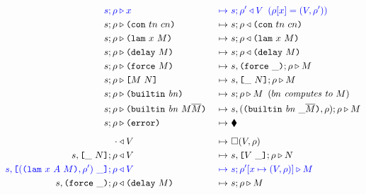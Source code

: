 \documentclass[../plutus-core-specification.tex]{subfiles}
\begin{document}
\begin{figure}[H]
\ContinuedFloat
  \begin{subfigure}[c]{\linewidth}

    \begin{minipage}{\linewidth}
\begin{alignat*}{2}
  \blue{s; \rho} & \bcompute \blue{x} &~\bmapsto~ &\blue{s;\rho^{\prime} \return V \enspace (\rho[x] = (V,\rho^{\prime}))}\\
  s;\rho & \compute \con{tn}{cn}                      &~\mapsto~& s;\rho \return \con{tn}{cn}\\
  s;\rho & \compute \lamU{x}{M}                       &~\mapsto~& s;\rho \return \lamU{x}{M}\\
  s;\rho & \compute \delay{M}                         &~\mapsto~& s;\rho \return \delay{M}\\
  s;\rho & \compute \force{M}                         &~\mapsto~& s,\inForceFrame{};\rho \compute M \\
  s;\rho & \compute \appU{M}{N}                       &~\mapsto~& s,\inAppLeftFrame{N};\rho \compute M\\
  s;\rho & \compute \builtinU{bn}{\!\!}               &~\mapsto~& s;\rho \compute M
                                                 \enspace (\textit{$bn$ computes to $M$}) \\
  s;\rho & \compute \builtinU{bn}{M \repetition{M}}   &~\mapsto~& s,(\inBuiltinU{bn}{}{\_}{\repetition{M}}, \rho);\rho \compute M\\
  s;\rho & \compute \errorU                           &~\mapsto~& \ckerror{}\\
  \\[-10pt] %
  \cdot & \return V                              &~\mapsto~& \square (V,\rho)\\
  s,\inAppLeftFrame{N};\rho& \return V               &~\mapsto~& s,\inAppRightFrame{V};\rho \compute N\\
  \blue{s,\inAppRightFrame{(\lam{x}{A}{M}, \rho^{\prime})}; \rho} &\breturn V &~\bmapsto~& \blue{s;\rho^{\prime}[x\mapsto (V,\rho)] \compute M}\\  %
  s,\inForceFrame{};\rho & \return \delay{M}          &~\mapsto~& s;\rho \compute M\\

\end{alignat*}
\end{minipage}
\end{subfigure}
\end{figure}
\end{document}
